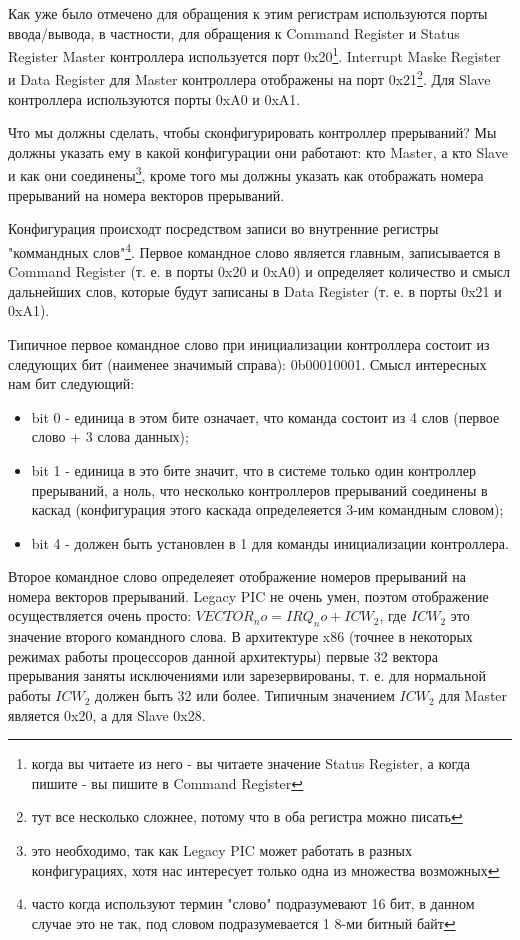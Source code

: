 Как уже было отмечено для обращения к этим регистрам используются порты
ввода/вывода, в частности, для обращения к Command Register и Status Register
Master контроллера используется порт 0x20\footnote{когда вы читаете из него - вы
читаете значение Status Register, а когда пишите - вы пишите в Command
Register}. Interrupt Maske Register и Data Register для Master контроллера
отображены на порт 0x21\footnote{тут все несколько сложнее, потому что в оба
регистра можно писать}. Для Slave контроллера используются порты 0xA0 и 0xA1.

Что мы должны сделать, чтобы сконфигурировать контроллер прерываний? Мы должны
указать ему в какой конфигурации они работают: кто Master, а кто Slave и как они
соединены\footnote{это необходимо, так как Legacy PIC может работать в разных
конфигурациях, хотя нас интересует только одна из множества возможных}, кроме
того мы должны указать как отображать номера прерываний на номера векторов
прерываний.

Конфигурация происходт посредством записи во внутренние регистры "коммандных
слов"\footnote{часто когда используют термин "слово" подразумевают 16 бит, в
данном случае это не так, под словом подразумевается 1 8-ми битный байт}. Первое
командное слово является главным, записывается в Command Register (т. е. в порты
0x20 и 0xA0) и определяет количество и смысл дальнейших слов, которые будут
записаны в Data Register (т. е. в порты 0x21 и 0xA1).

Типичное первое командное слово при инициализации контроллера состоит из
следующих бит (наименее значимый справа): 0b00010001. Смысл интересных нам бит
следующий:

\begin{itemize}
  \item bit 0 - единица в этом бите означает, что команда состоит из 4 слов
        (первое слово + 3 слова данных);
  \item bit 1 - единица в это бите значит, что в системе только один контроллер
        прерываний, а ноль, что несколько контроллеров прерываний соединены в
        каскад (конфигурация этого каскада определеяется 3-им командным словом);
  \item bit 4 - должен быть установлен в 1 для команды инициализации
        контроллера.
\end{itemize}

Второе командное слово определеяет отображение номеров прерываний на номера
векторов прерываний. Legacy PIC не очень умен, поэтом отображение осуществляется
очень просто: $VECTOR_no = IRQ_no + ICW_2$, где $ICW_2$ это значение второго
командного слова. В архитектуре x86 (точнее в некоторых режимах работы
процессоров данной архитектуры) первые 32 вектора прерывания заняты исключениями
или зарезервированы, т. е. для нормальной работы $ICW_2$ должен быть 32 или
более. Типичным значением $ICW_2$ для Master является 0x20, а для Slave 0x28.

